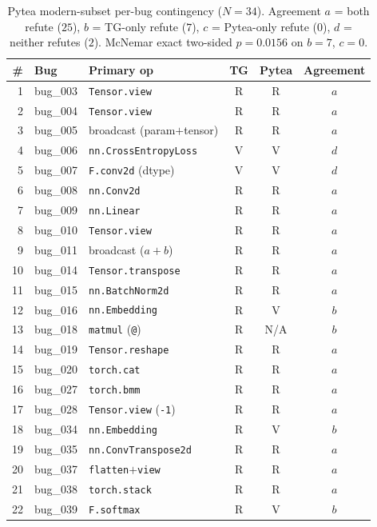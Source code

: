\begin{table}[h]
\centering\scriptsize
\setlength{\tabcolsep}{3pt}
\caption{Pytea modern-subset per-bug contingency ($N{=}34$).
Agreement $a$ = both refute ($25$),
$b$ = TG-only refute ($7$), $c$ = Pytea-only refute ($0$),
$d$ = neither refutes ($2$). McNemar exact two-sided
$p{=}0.0156$ on $b{=}7$, $c{=}0$.}
\label{tab:pytea-percase}
\begin{tabular}{r l l c c c}
\toprule
\# & Bug & Primary op & TG & Pytea & Agreement \\
\midrule
1 & bug\_003 & \texttt{Tensor.view} & R & R & $a$ \\
2 & bug\_004 & \texttt{Tensor.view} & R & R & $a$ \\
3 & bug\_005 & broadcast (param$+$tensor) & R & R & $a$ \\
4 & bug\_006 & \texttt{nn.CrossEntropyLoss} & V & V & $d$ \\
5 & bug\_007 & \texttt{F.conv2d} (dtype) & V & V & $d$ \\
6 & bug\_008 & \texttt{nn.Conv2d} & R & R & $a$ \\
7 & bug\_009 & \texttt{nn.Linear} & R & R & $a$ \\
8 & bug\_010 & \texttt{Tensor.view} & R & R & $a$ \\
9 & bug\_011 & broadcast ($a{+}b$) & R & R & $a$ \\
10 & bug\_014 & \texttt{Tensor.transpose} & R & R & $a$ \\
11 & bug\_015 & \texttt{nn.BatchNorm2d} & R & R & $a$ \\
12 & bug\_016 & \texttt{nn.Embedding} & R & V & $b$ \\
13 & bug\_018 & \texttt{matmul} (\texttt{@}) & R & N/A & $b$ \\
14 & bug\_019 & \texttt{Tensor.reshape} & R & R & $a$ \\
15 & bug\_020 & \texttt{torch.cat} & R & R & $a$ \\
16 & bug\_027 & \texttt{torch.bmm} & R & R & $a$ \\
17 & bug\_028 & \texttt{Tensor.view} (\texttt{-1}) & R & R & $a$ \\
18 & bug\_034 & \texttt{nn.Embedding} & R & V & $b$ \\
19 & bug\_035 & \texttt{nn.ConvTranspose2d} & R & R & $a$ \\
20 & bug\_037 & \texttt{flatten}$+$\texttt{view} & R & R & $a$ \\
21 & bug\_038 & \texttt{torch.stack} & R & R & $a$ \\
22 & bug\_039 & \texttt{F.softmax} & R & V & $b$ \\

\end{tabular}
\end{table}
